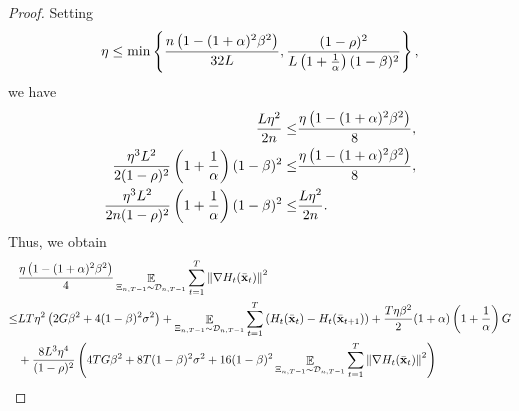 \documentclass{article}
\begin{document}
\begin{proof}
Setting 
\begin{align}
\nonumber
\eta \le \min\left\{ \frac{n\left(  1-(1+\alpha)^2\beta^2  \right)}{32L}, \frac{(1-\rho)^2}{L\left( 1+\frac{1}{\alpha} \right)(1-\beta)^2} \right\},
\end{align}
 we have
\begin{align}
\nonumber
\frac{L\eta^2}{2n} \le & \frac{\eta\left(  1-(1+\alpha)^2\beta^2  \right)}{8}, \\ \nonumber
\frac{\eta^3 L^2}{2(1-\rho)^2} \left( 1+\frac{1}{\alpha} \right)(1-\beta)^2 \le & \frac{\eta\left(  1-(1+\alpha)^2\beta^2  \right)}{8}, \\ \nonumber
\frac{\eta^3 L^2}{2n(1-\rho)^2} \left( 1+\frac{1}{\alpha} \right)(1-\beta)^2 \le & \frac{L\eta^2}{2n}.
\end{align} Thus, we obtain
\begin{align}
\nonumber
& \frac{\eta\left(  1-(1+\alpha)^2\beta^2  \right)}{4} \mathop{\mathbb{E}}_{ \Xi_{n,T-1} \sim \mathcal{D}_{n,T-1} }\sum_{t=1}^T\left\lVert\nabla H_t(\bar{{\bf x}}_t)\right\rVert^2 \\ \nonumber 
\le &  LT\eta^2 \left(  2G\beta^2  +  4(1-\beta)^2 \sigma^2  \right)  + \mathop{\mathbb{E}}_{ \Xi_{n,T-1} \sim \mathcal{D}_{n,T-1} } \sum_{t=1}^T \left(  H_t(\bar{{\bf x}}_t) -  H_t(\bar{{\bf x}}_{t+1})  \right) + \frac{T \eta \beta^2}{2} (1+\alpha) \left( 1+\frac{1}{\alpha} \right)  G \\ \nonumber
& +   \frac{8L^3\eta^4}{(1-\rho)^2} \left(  4TG\beta^2  +  8T(1-\beta)^2 \sigma^2 + 16(1-\beta)^2 \mathop{\mathbb{E}}_{ \Xi_{n,T-1} \sim \mathcal{D}_{n,T-1} }\sum_{t=1}^T \left\lVert\nabla H_t(\bar{{\bf x}}_t)\right\rVert^2  \right)  
\end{align}













\end{proof}
\end{document}
